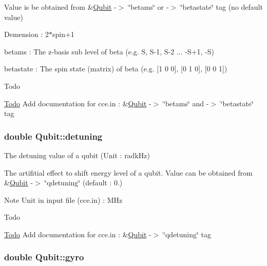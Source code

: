 Value is be obtained from \&\hyperlink{structQubit}{Qubit} -\/$>$ \char`\"{}betams\char`\"{} or -\/$>$ \char`\"{}betastate\char`\"{} tag (no default value)
\begin{DoxyItemize}
\item Demension \-: 2$\ast$spin+1
\item betams \-: The z-\/basis sub level of beta (e.\-g. S, S-\/1, S-\/2 ... -\/\-S+1, -\/\-S)
\item betastate \-: The spin state (matrix) of beta (e.\-g. \mbox{[}1 0 0\mbox{]}, \mbox{[}0 1 0\mbox{]}, \mbox{[}0 0 1\mbox{]}) \begin{DoxyRefDesc}{Todo}
\item[\hyperlink{todo__todo000024}{Todo}]Add documentation for cce.\-in \-: \&\hyperlink{structQubit}{Qubit} -\/$>$ \char`\"{}betams\char`\"{} and -\/$>$ \char`\"{}betastate\char`\"{} tag \end{DoxyRefDesc}

\end{DoxyItemize}\hypertarget{structQubit_a6e0e926587994ef24d67431d0dbef9e7}{
\subsubsection[{detuning}]{\setlength{\rightskip}{0pt plus 5cm}double Qubit\-::detuning}}\label{structQubit_a6e0e926587994ef24d67431d0dbef9e7}


The detuning value of a qubit (Unit \-: radk\-Hz) 

The artifitial effect to shift energy level of a qubit. Value can be obtained from \&\hyperlink{structQubit}{Qubit} -\/$>$ \char`\"{}qdetuning\char`\"{} (default \-: 0.) \begin{DoxyNote}{Note}
Unit in input file (cce.\-in) \-: M\-Hz 
\end{DoxyNote}
\begin{DoxyRefDesc}{Todo}
\item[\hyperlink{todo__todo000021}{Todo}]Add documentation for cce.\-in \-: \&\hyperlink{structQubit}{Qubit} -\/$>$ \char`\"{}qdetuning\char`\"{} tag \end{DoxyRefDesc}
\hypertarget{structQubit_a668a62d3ddf72e6b9acbc6338c97090f}{
\subsubsection[{gyro}]{\setlength{\rightskip}{0pt plus 5cm}double Qubit\-::gyro}}\label{structQubit_a668a62d3ddf72e6b9acbc6338c97090f}



